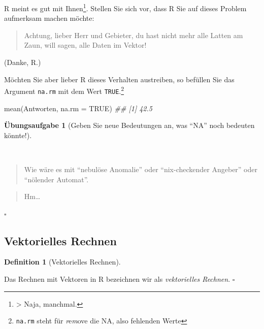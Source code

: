 \documentclass[
  a4paper,
  DIV=11]{scrreprt}
\newenvironment{Shaded}{\begin{snugshade}}{\end{snugshade}}
\newcommand{\AttributeTok}[1]{\textcolor[rgb]{0.40,0.45,0.13}{#1}}
\newcommand{\ConstantTok}[1]{\textcolor[rgb]{0.56,0.35,0.01}{#1}}
\newcommand{\DocumentationTok}[1]{\textcolor[rgb]{0.37,0.37,0.37}{\textit{#1}}}
\newcommand{\FunctionTok}[1]{\textcolor[rgb]{0.28,0.35,0.67}{#1}}
\newcommand{\NormalTok}[1]{\textcolor[rgb]{0.00,0.23,0.31}{#1}}
\theoremstyle{definition}
\newtheorem{exercise}{Übungsaufgabe}[chapter]
\theoremstyle{definition}
\theoremstyle{definition}
\newtheorem{definition}{Definition}[chapter]
\theoremstyle{remark}
\begin{document}
R meint es gut mit Ihnen\footnote{\textgreater{} {} Naja,
  manchmal.}. Stellen Sie sich vor, dass R Sie auf dieses Problem
aufmerksam machen möchte:

\begin{quote}
{} Achtung, lieber Herr und Gebieter, du hast nicht mehr
alle Latten am Zaun, will sagen, alle Daten im Vektor!
\end{quote}

(Danke, R.)

Möchten Sie aber lieber R dieses Verhalten austreiben, so befüllen Sie
das Argument \texttt{na.rm} mit dem Wert \texttt{TRUE}.\footnote{\texttt{na.rm}
  steht für \emph{r}e\emph{m}ove die NA, also fehlenden Werte}

\begin{Shaded}
\begin{Highlighting}[]
\FunctionTok{mean}\NormalTok{(Antworten, }\AttributeTok{na.rm =} \ConstantTok{TRUE}\NormalTok{)}
\DocumentationTok{\#\# [1] 42.5}
\end{Highlighting}
\end{Shaded}

\begin{exercise}[Geben Sie neue Bedeutungen an, was ``NA'' noch bedeuten
könnte!]\protect\hypertarget{exr-na}{}\label{exr-na}

~

\begin{quote}
{} Wie wäre es mit ``nebulöse Anomalie'' oder
``nix-checkender Angeber'' oder ``nölender Automat''.
\end{quote}

\begin{quote}
{} Hm\ldots{}
\end{quote}

\(\square\)

\end{exercise}

\subsection{Vektorielles Rechnen}\label{sec-veccalc}

\begin{definition}[Vektorielles
Rechnen]\protect\hypertarget{def-veccalc}{}\label{def-veccalc}

Das Rechnen mit Vektoren in R bezeichnen wir als \emph{vektorielles
Rechnen}. \(\square\)

\end{definition}
\end{document}
